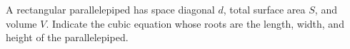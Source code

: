 A rectangular parallelepiped has space diagonal $d$, total surface area $S$, and volume $V$. Indicate the cubic equation whose roots are the length, width, and height of the parallelepiped.
